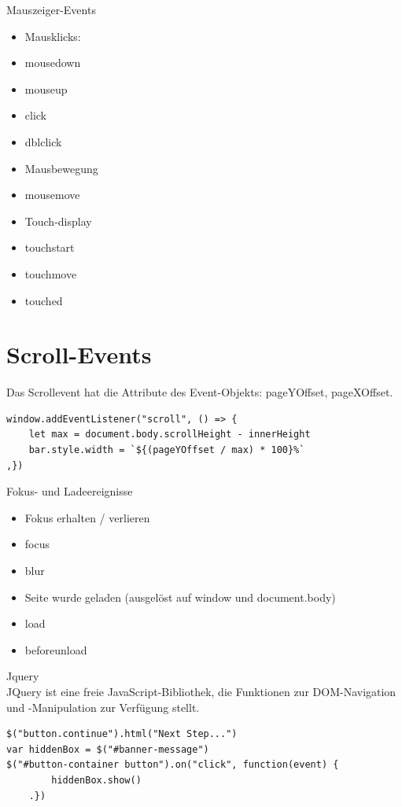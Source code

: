 \documentclass[10pt]{article}
\begin{document}
Mauszeiger-Events

\begin{itemize}
  \item Mausklicks:
  \item mousedown
  \item mouseup
  \item click
  \item dblclick
  \item Mausbewegung
  \item mousemove
  \item Touch-display
  \item touchstart
  \item touchmove
  \item touched
\end{itemize}

\section*{Scroll-Events}
Das Scrollevent hat die Attribute des Event-Objekts: pageYOffset, pageXOffset.

\begin{verbatim}
window.addEventListener("scroll", () => {
    let max = document.body.scrollHeight - innerHeight
    bar.style.width = `${(pageYOffset / max) * 100}%`
,})
\end{verbatim}

Fokus- und Ladeereignisse

\begin{itemize}
  \item Fokus erhalten / verlieren
  \item focus
  \item blur
  \item Seite wurde geladen (ausgelöst auf window und document.body)
  \item load
  \item beforeunload
\end{itemize}

Jquery\\
JQuery ist eine freie JavaScript-Bibliothek, die Funktionen zur DOM-Navigation und -Manipulation zur Verfügung stellt.

\begin{verbatim}
$("button.continue").html("Next Step...")
var hiddenBox = $("#banner-message")
$("#button-container button").on("click", function(event) {
        hiddenBox.show()
    .})
\end{verbatim}
\end{document}
